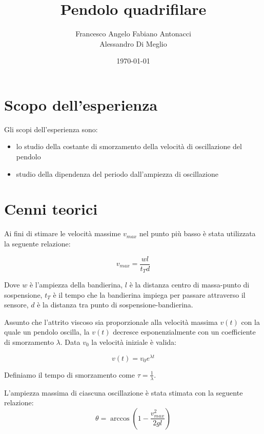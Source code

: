 \documentclass{article}
\title{Pendolo quadrifilare}
\author{Francesco Angelo Fabiano Antonacci \\ Alessandro Di Meglio}
\date{\today}
\begin{document}
\maketitle
\section{Scopo dell'esperienza}
Gli scopi dell'esperienza sono:

\begin{itemize}
\item lo studio della costante di smorzamento della velocità di oscillazione del pendolo 
\item studio della dipendenza del periodo dall'ampiezza di oscillazione
\end{itemize}




\section{Cenni teorici}

Ai fini di stimare le velocità massime $v_{max}$ nel punto più basso è stata utilizzata la seguente relazione:

\begin{equation}
v_{max}= \frac{w l}{t_T d}
\label{eq:vmax}
\end{equation}

Dove $w$ è l'ampiezza della bandierina, $l$ è la distanza centro di massa-punto di sospensione, $t_T$ è il tempo che la bandierina impiega per passare attraverso il sensore, $d$ è la distanza tra punto di sospensione-bandierina.




Assunto che l'attrito viscoso sia proporzionale alla velocità massima $v(t)$ con la quale un pendolo oscilla, la $v(t)$  decresce esponenzialmente con un coefficiente di smorzamento $\lambda$. Data $v_0$ la velocità iniziale è valida:  

\begin{equation}
v(t) = v_0 e^{\lambda t}
\label{eq:vt}
\end{equation}

Definiamo il tempo di smorzamento come $\tau=\frac{1}{\lambda}$.

L'ampiezza massima  di ciascuna oscillazione è stata stimata con la seguente relazione:
\begin{equation}
\theta = \arccos(1-\frac{v_{max}^2}{2gl})
\label{eq:thmax}
\end{equation}
\end{document}
